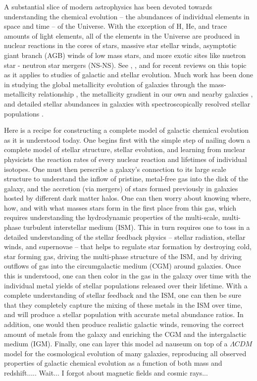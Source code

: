 A substantial slice of modern astrophysics has been devoted towards understanding the chemical evolution -- the abundances of individual elements in space and time -- of the Universe. With the exception of H, He, and trace amounts of light elements, all of the elements in the Universe are produced in nuclear reactions in the cores of stars, massive star stellar winds, asymptotic giant branch (AGB) winds of low mass stars, and more exotic sites like nuetron star - neutron star mergers (NS-NS). See \cite{Nomoto2013}, \cite{Thielmann2017}, and \cite{Frebel2018} for recent reviews on this topic as it applies to studies of galactic and stellar evolution. Much work has been done in studying the global metallicity evolution of galaxies through the mass-metallicity relationship \citep[e.g.][]{Lequeux1979,Tremonti2004,Lee2006,Zahid2012}, the metallicity gradient in our own and nearby galaxies \citep[e.g.][]{}, and detailed stellar abundances in galaxies with spectroscopically resolved stellar populations \citep[e.g.][]{}. 

Here is a recipe for constructing a complete model of galactic chemical evolution as it is understood today. One begins first with the simple step of nailing down a complete model of stellar structure, stellar evolution, and learning from nuclear physicists the reaction rates of every nuclear reaction and lifetimes of individual isotopes. One must then perscribe a galaxy's connection to its large scale structure to understand the inflow of pristine, metal-free gas into the disk of the galaxy, and the accretion (via mergers) of stars formed previously in galaxies hosted by different dark matter halos. One can then worry about knowing where, how, and with what masses stars form in the first place from this gas, which requires understanding the hydrodynamic 
properties of the multi-scale, multi-phase turbulent interstellar medium (ISM). This in turn requires one to toss in a detailed understanding of the stellar feedback physics -- stellar radiation, stellar winds, and supernovae -- that helps to regulate star formation by destroying cold, star forming gas, driving the multi-phase structure of the ISM, and by driving outflows of gas into the circumgalactic medium (CGM) around galaxies. Once this is understood, one can then color in the gas in the galaxy over time with the individual metal yields of stellar populations released over their lifetime. With a complete understanding of stellar feedback and the ISM, one can then be sure that they completely capture the mixing of these metals in the ISM over time, and will produce a stellar population with accurate metal abundance ratios. In addition, one would then produce realistic galactic winds, removing the correct amount of metals from the galaxy and enriching the CGM and the intergalactic medium (IGM). Finally, one can layer this model ad nauseum on top of a $\Lambda CDM$ model for the cosmological evolution of many galaxies, reproducing all observed properties of galactic chemical evolution as a function of both mass and redshift..... Wait... I forgot about magnetic fields and cosmic rays...

